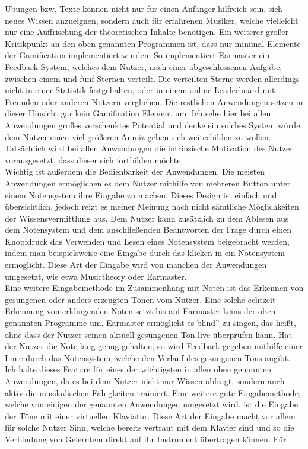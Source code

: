 Übungen bzw. Texte können nicht nur für einen Anfänger hilfreich sein, sich neues Wissen anzueignen, sondern auch für erfahrenen Musiker, welche vielleicht nur eine Auffrischung der theoretischen Inhalte benötigen. Ein weiterer großer Kritikpunkt an den oben genannten Programmen ist, dass nur minimal Elemente der Gamification implementiert wurden. So implementiert Earmaster ein Feedback System, 
welches dem Nutzer, nach einer abgeschlossenen Aufgabe, zwischen einem und fünf Sternen verteilt. Die verteilten Sterne werden allerdings nicht in einer Statistik festgehalten, oder in einem online Leaderboard mit Freunden oder anderen Nutzern verglichen. Die restlichen Anwendungen setzen in dieser Hinsicht gar kein Gamification Element um. Ich sehe hier bei allen Anwendungen großes verschenktes Potential und denke ein solches System würde dem Nutzer einen viel größeren Anreiz geben sich weiterbilden zu wollen. Tatsächlich wird bei allen Anwendungen die intrinsische Motivation des Nutzer vorausgesetzt, dass dieser sich fortbilden möchte. \\ 
Wichtig ist außerdem die Bedienbarkeit der Anwendungen. Die meisten Anwendungen ermöglichen es dem Nutzer mithilfe von mehreren Button unter einem Notensystem ihre Eingabe zu machen. Dieses Design ist einfach und übersichtlich, jedoch reizt es meiner Meinung nach nicht sämtliche Möglichkeiten der Wissensvermittlung aus. Dem Nutzer kann zusätzlich zu dem Ablesen aus dem Notensystem und dem anschließenden Beantworten der Frage durch einen Knopfdruck das Verwenden und Lesen eines Notensystem beigebracht werden, indem man beispielsweise eine Eingabe durch das klicken in ein Notensystem ermöglicht. Diese Art der Eingabe wird von manchen der Anwendungen umgesetzt, wie etwa Musictheory oder Earmaster. \\
Eine weitere Eingabemethode im Zusammenhang mit Noten ist das Erkennen von gesungenen oder anders erzeugten Tönen vom Nutzer. Eine solche echtzeit Erkennung von erklingenden Noten setzt bis auf Earmaster keins der oben genannten Programme um. Earmaster ermöglicht es \glqq blind'' zu singen, das heißt, ohne dass der Nutzer seinen aktuell gesungenen Ton live überprüfen kann. Hat der Nutzer die 
Note lang genug gehalten, so wird Feedback gegeben mithilfe einer Linie durch das Notensystem, welche den Verlauf des gesungenen Tons angibt. Ich halte dieses Feature für eines der wichtigsten in allen oben genannten Anwendungen, da es bei dem Nutzer nicht nur Wissen abfragt, sondern auch aktiv die musikalischen Fähigkeiten trainiert.
Eine weitere gute Eingabemethode, welche von einigen der genannten Anwendungen umgesetzt wird, ist die Eingabe der Töne mit einer virtuellen Klaviatur. Diese Art der Eingabe macht vor allem für solche Nutzer Sinn, welche bereits vertraut mit dem Klavier sind und so die Verbindung von Gelerntem direkt auf ihr Instrument übertragen können. Für 
